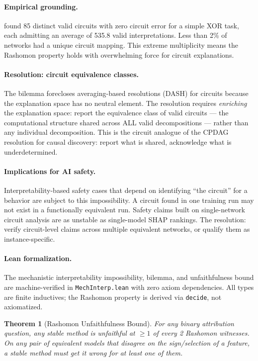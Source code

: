 \documentclass{article}
\newtheorem{theorem}{Theorem}
\begin{document}
\paragraph{Empirical grounding.}
\citet{meloux2025circuits} found 85 distinct valid circuits with zero circuit error for a simple XOR task, each admitting an average of 535.8 valid interpretations. Less than 2\% of networks had a unique circuit mapping. This extreme multiplicity means the Rashomon property holds with overwhelming force for circuit explanations.

\paragraph{Resolution: circuit equivalence classes.}
The bilemma forecloses averaging-based resolutions (DASH) for circuits because the explanation space has no neutral element. The resolution requires \emph{enriching} the explanation space: report the equivalence class of valid circuits --- the computational structure shared across ALL valid decompositions --- rather than any individual decomposition. This is the circuit analogue of the CPDAG resolution for causal discovery: report what is shared, acknowledge what is underdetermined.

\paragraph{Implications for AI safety.}
Interpretability-based safety cases that depend on identifying ``the circuit'' for a behavior are subject to this impossibility. A circuit found in one training run may not exist in a functionally equivalent run. Safety claims built on single-network circuit analysis are as unstable as single-model SHAP rankings. The resolution: verify circuit-level claims across multiple equivalent networks, or qualify them as instance-specific.

\paragraph{Lean formalization.}
The mechanistic interpretability impossibility, bilemma, and unfaithfulness bound are machine-verified in \texttt{MechInterp.lean} with zero axiom dependencies. All types are finite inductives; the Rashomon property is derived via \texttt{decide}, not axiomatized.

\begin{theorem}[Rashomon Unfaithfulness Bound]\label{thm:unfaith-bound}
For any binary attribution question, any stable method is unfaithful at $\geq 1$ of every 2 Rashomon witnesses.
On any pair of equivalent models that disagree on the sign/selection of a feature, a stable method must get it wrong for at least one of them.
\end{theorem}
\end{document}
